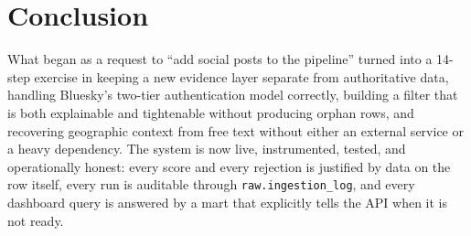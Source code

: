 \documentclass[11pt]{article}
\begin{document}
\section{Conclusion}

What began as a request to ``add social posts to the pipeline'' turned
into a 14-step exercise in keeping a new evidence layer separate from
authoritative data, handling Bluesky's two-tier authentication model
correctly, building a filter that is both explainable and tightenable
without producing orphan rows, and recovering geographic context from
free text without either an external service or a heavy dependency.
The system is now live, instrumented, tested, and operationally
honest: every score and every rejection is justified by data on the
row itself, every run is auditable through
\texttt{raw.ingestion\_log}, and every dashboard query is answered by
a mart that explicitly tells the API when it is not ready.
\end{document}
